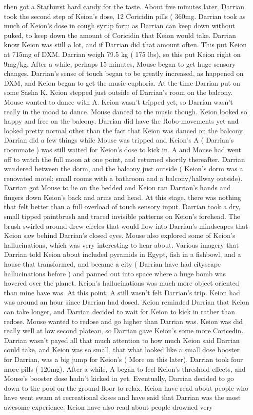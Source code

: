 \documentclass[12pt]{book}
\begin{document}
then got a Starburst hard candy for the taste. About five minutes later, Darrian took the second step of Keion's dose, 12 Coricidin pills ( 360mg. Darrian took as much of Keion's dose in cough syrup form as Darrian can keep down without puked, to keep down the amount of Coricidin that Keion would take. Darrian know Keion was still a lot, and if Darrian did that amount often. This put Keion at 715mg of DXM. Darrian weigh 79.5 kg ( 175 lbs), so this put Keion right on 9mg/kg. After a while, perhaps 15 minutes, Mouse began to get huge sensory changes. Darrian's sense of touch began to be greatly increased, as happened on DXM, and Keion began to get the music euphoria. At the time Darrian put on some Sasha K. Keion stepped just outside of Darrian's room on the balcony. Mouse wanted to dance with A. Keion wasn't tripped yet, so Darrian wasn't really in the mood to dance. Mouse danced to the music though. Keion looked so happy and free on the balcony. Darrian did have the Robo-movements yet and looked pretty normal other than the fact that Keion was danced on the balcony. Darrian did a few things while Mouse was tripped and Keion's A ( Darrian's roommate ) was still waited for Keion's dose to kick in. A and Mouse had went off to watch the full moon at one point, and returned shortly thereafter. Darrian wandered between the dorm, and the balcony just outside ( Keion's dorm was a renovated motel; small rooms with a bathroom and a balcony/hallway outside). Darrian got Mouse to lie on the bedded and Keion ran Darrian's hands and fingers down Keion's back and arms and head. At this stage, there was nothing that felt better than a full overload of touch sensory input. Darrian took a dry, small tipped paintbrush and traced invisible patterns on Keion's forehead. The brush swirled around drew circles that would flow into Darrian's mindscapes that Keion saw behind Darrian's closed eyes. Mouse also explored some of Keion's hallucinations, which was very interesting to hear about. Various imagery that Darrian told Keion about included pyramids in Egypt, fish in a fishbowl, and a house that transformed, and became a city ( Darrian have had cityscape hallucinations before ) and panned out into space where a huge bomb was hovered over the planet. Keion's hallucinations was much more object oriented than mine have was. At this point, A still wasn't felt Darrian's trip. Keion had was around an hour since Darrian had dosed. Keion reminded Darrian that Keion can take longer, and Darrian decided to wait for Keion to kick in rather than redose. Mouse wanted to redose and go higher than Darrian was. Keion was did really well at low second plateau, so Darrian gave Keion's some more Coricedin. Darrian wasn't payed all that much attention to how much Keion said Darrian could take, and Keion was so small, that what looked like a small dose booster for Darrian, was a big jump for Keion's ( More on this later). Darrian took four more pills ( 120mg). After a while, A began to feel Keion's threshold effects, and Mouse's booster dose hadn't kicked in yet. Eventually, Darrian decided to go down to the pool on the ground floor to relax. Keion have read about people who have went swam at recreational doses and have said that Darrian was the most awesome experience. Keion have also read about people drowned very 
\end{document}
